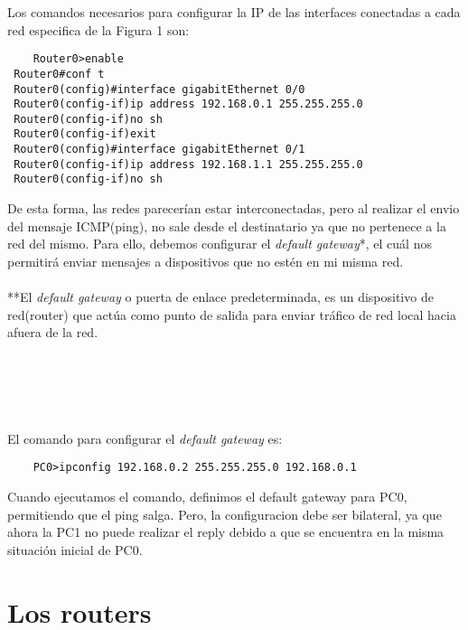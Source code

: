 \documentclass{article}
\begin{document}
Los comandos necesarios para configurar la IP de las interfaces conectadas a cada red especifica de la Figura 1 son:
\begin{lstlisting}
    Router0>enable
 Router0#conf t
 Router0(config)#interface gigabitEthernet 0/0
 Router0(config-if)ip address 192.168.0.1 255.255.255.0
 Router0(config-if)no sh
 Router0(config-if)exit
 Router0(config)#interface gigabitEthernet 0/1
 Router0(config-if)ip address 192.168.1.1 255.255.255.0
 Router0(config-if)no sh
\end{lstlisting}
De esta forma, las redes parecerían estar interconectadas, pero al realizar el envio del mensaje ICMP(ping), no sale desde el destinatario ya que no pertenece a la red del mismo. Para ello, debemos configurar el \textit{default gateway}*, el cuál nos permitirá enviar mensajes a dispositivos que no estén en mi misma red.
\\\\
**El \textit{default gateway} o puerta de enlace predeterminada, es un dispositivo de red(router) que actúa como punto de salida para enviar tráfico de red local hacia afuera de la red.
\\\\
\\\\
\\\\
El comando para configurar el \textit{default gateway} es:
\begin{lstlisting}
    PC0>ipconfig 192.168.0.2 255.255.255.0 192.168.0.1
\end{lstlisting}
Cuando ejecutamos el comando, definimos el default gateway para PC0, permitiendo que el ping salga. Pero, la configuracion debe ser bilateral, ya que ahora la PC1 no puede realizar el reply debido a que se encuentra en la misma situación inicial de PC0.

\section{Los routers}
\end{document}
